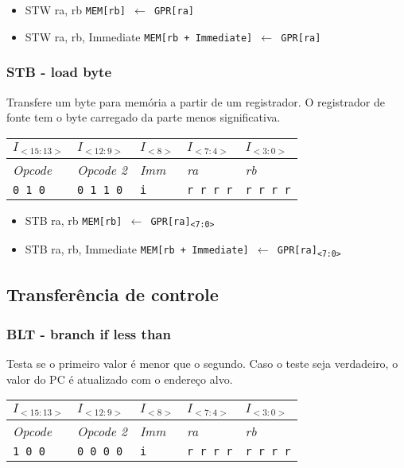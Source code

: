 \documentclass[11pt,a4paper]{report}
\begin{document}
\begin{itemize}
\item STW ra, rb
\subitem \texttt{MEM[rb] $\leftarrow$ GPR[ra]}
\item STW ra, rb, Immediate
\subitem \texttt{MEM[rb + Immediate] $\leftarrow$ GPR[ra]}
\end{itemize}

\subsubsection{STB - load byte}

Transfere um byte para memória a partir de um registrador. O registrador
de fonte tem o byte carregado da parte menos significativa.

\begin{table}[htb!]
\centering
\begin{tabular}{|p{2cm}|p{2cm}|p{2cm}|p{2cm}|p{2cm}|}
\hline
$I_{<15:13>}$ & $I_{<12:9>}$ & $I_{<8>}$ & $I_{<7:4>}$ & $I_{<3:0>}$  \\ \hline
\textit{Opcode} & \textit{Opcode 2} & \textit{Imm} & \textit{ra} & \textit{rb} \\ \hline
\texttt{0 1 0} & \texttt{0 1 1 0} & \texttt{i} & \texttt{r r r r} & \texttt{r r r r} \\ \hline
\end{tabular}
\end{table}

\begin{itemize}
\item STB ra, rb
\subitem \texttt{MEM[rb] $\leftarrow$ GPR[ra]\textsubscript{<7:0>}}
\item STB ra, rb, Immediate
\subitem \texttt{MEM[rb + Immediate] $\leftarrow$ GPR[ra]\textsubscript{<7:0>}}
\end{itemize}


\subsection{Transferência de controle}

\subsubsection{BLT - branch if less than}
Testa se o primeiro valor é menor que o segundo. Caso o teste seja
verdadeiro, o valor do PC é atualizado com o endereço alvo.

\begin{table}[htb!]
\centering
\begin{tabular}{|p{2cm}|p{2cm}|p{2cm}|p{2cm}|p{2cm}|}
\hline
$I_{<15:13>}$ & $I_{<12:9>}$ & $I_{<8>}$ & $I_{<7:4>}$ & $I_{<3:0>}$  \\ \hline
\textit{Opcode} & \textit{Opcode 2} & \textit{Imm} & \textit{ra} & \textit{rb} \\ \hline
\texttt{1 0 0} & \texttt{0 0 0 0} & \texttt{i} & \texttt{r r r r} & \texttt{r r r r} \\ \hline
\end{tabular}
\end{table}
\end{document}
